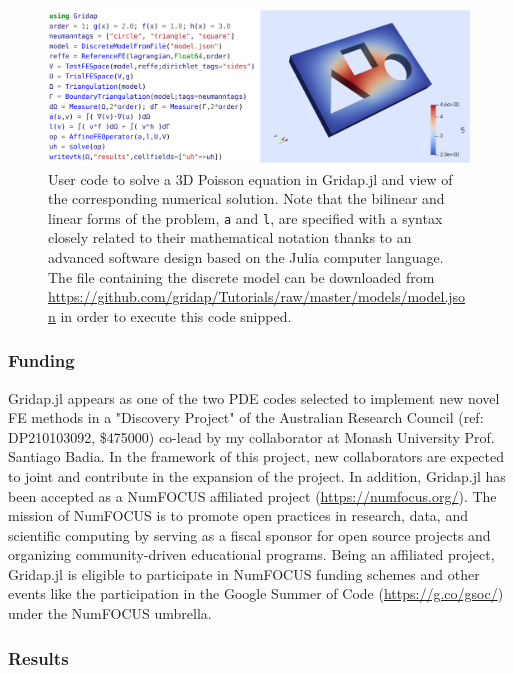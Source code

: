 \documentclass{article}
\begin{document}
\begin{figure}[ht!]
\includegraphics[width=\textwidth]{../_assets/fig11.png}
\caption{User code to solve a 3D Poisson equation in Gridap.jl and view of the corresponding numerical solution. Note that the bilinear and linear forms of the problem, \texttt{a} and \texttt{l}, are specified with a syntax closely related to their mathematical notation thanks to an advanced software design based on the Julia computer language. The file containing the discrete model can be downloaded from \url{https://github.com/gridap/Tutorials/raw/master/models/model.json} in order to execute this code snipped.} 
\label{fig:gridap-code}
\end{figure}

\subsubsection{Funding}

Gridap.jl appears as one of the two  PDE codes selected to implement new novel FE methods in a { "Discovery Project" of the Australian Research Council} (ref: DP210103092, \$475000) co-lead by my collaborator at Monash University Prof. Santiago Badia. In the framework of this project, new collaborators are expected to joint and contribute in the expansion of the project. In addition, Gridap.jl has been accepted as a {NumFOCUS affiliated project} (\url{https://numfocus.org/}). The mission of NumFOCUS is to promote open practices in research, data, and scientific computing by serving as a fiscal sponsor for open source projects and organizing community-driven educational programs. Being an affiliated project, Gridap.jl is eligible to participate in NumFOCUS funding schemes and other events like the participation in the Google Summer of Code (\url{https://g.co/gsoc/}) under the NumFOCUS umbrella.

\subsubsection{Results}
\end{document}
